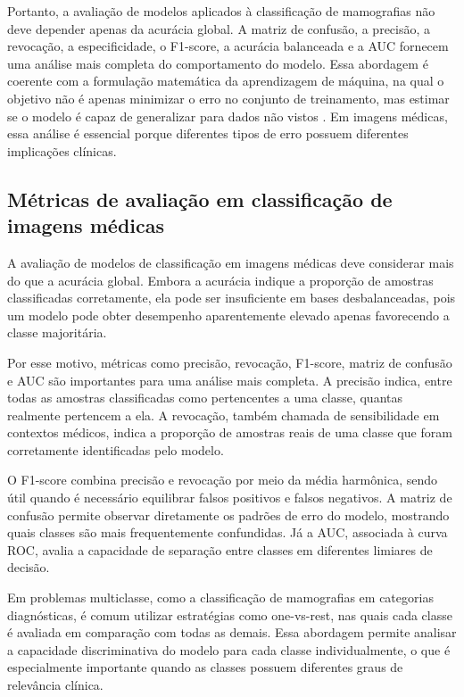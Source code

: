 \documentclass[
    12pt,
    openright,
    oneside,
    a4paper,
    english,
    brazil
]{abntex2}
\begin{document}
Portanto, a avaliação de modelos aplicados à classificação de mamografias não deve depender apenas da acurácia global. A matriz de confusão, a precisão, a revocação, a especificidade, o F1-score, a acurácia balanceada e a AUC fornecem uma análise mais completa do comportamento do modelo. Essa abordagem é coerente com a formulação matemática da aprendizagem de máquina, na qual o objetivo não é apenas minimizar o erro no conjunto de treinamento, mas estimar se o modelo é capaz de generalizar para dados não vistos \cite{deisenroth2020mathematics}. Em imagens médicas, essa análise é essencial porque diferentes tipos de erro possuem diferentes implicações clínicas.


\subsection{Métricas de avaliação em classificação de imagens médicas}

A avaliação de modelos de classificação em imagens médicas deve considerar mais do que a acurácia global. Embora a acurácia indique a proporção de amostras classificadas corretamente, ela pode ser insuficiente em bases desbalanceadas, pois um modelo pode obter desempenho aparentemente elevado apenas favorecendo a classe majoritária.

Por esse motivo, métricas como precisão, revocação, F1-score, matriz de confusão e AUC são importantes para uma análise mais completa. A precisão indica, entre todas as amostras classificadas como pertencentes a uma classe, quantas realmente pertencem a ela. A revocação, também chamada de sensibilidade em contextos médicos, indica a proporção de amostras reais de uma classe que foram corretamente identificadas pelo modelo.

O F1-score combina precisão e revocação por meio da média harmônica, sendo útil quando é necessário equilibrar falsos positivos e falsos negativos. A matriz de confusão permite observar diretamente os padrões de erro do modelo, mostrando quais classes são mais frequentemente confundidas. Já a AUC, associada à curva ROC, avalia a capacidade de separação entre classes em diferentes limiares de decisão.

Em problemas multiclasse, como a classificação de mamografias em categorias diagnósticas, é comum utilizar estratégias como one-vs-rest, nas quais cada classe é avaliada em comparação com todas as demais. Essa abordagem permite analisar a capacidade discriminativa do modelo para cada classe individualmente, o que é especialmente importante quando as classes possuem diferentes graus de relevância clínica.
\end{document}
